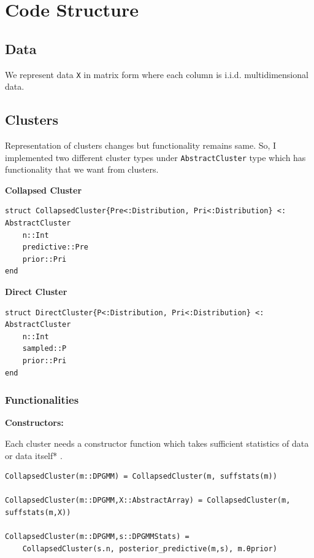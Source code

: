 \documentclass[a4paper]{article}
\begin{document}
\section{Code Structure}


\subsection{Data}

We represent data \texttt{X} in matrix form where each column is i.i.d.
multidimensional data.


\subsection{Clusters}

Representation of clusters changes but functionality remains same. So, I
implemented two different cluster types under \texttt{AbstractCluster}
type which has functionality that we want from clusters.

\textbf{Collapsed Cluster}

\begin{lstlisting}
struct CollapsedCluster{Pre<:Distribution, Pri<:Distribution} <: AbstractCluster
    n::Int
    predictive::Pre
    prior::Pri
end
\end{lstlisting}

\textbf{Direct Cluster}

\begin{lstlisting}
struct DirectCluster{P<:Distribution, Pri<:Distribution} <: AbstractCluster
    n::Int
    sampled::P
    prior::Pri
end
\end{lstlisting}


\subsubsection{Functionalities}

\textbf{Constructors:}

Each cluster needs a constructor function which takes sufficient
statistics of data or data itself* .
\begin{lstlisting}
CollapsedCluster(m::DPGMM) = CollapsedCluster(m, suffstats(m))

CollapsedCluster(m::DPGMM,X::AbstractArray) = CollapsedCluster(m, suffstats(m,X))

CollapsedCluster(m::DPGMM,s::DPGMMStats) = 
    CollapsedCluster(s.n, posterior_predictive(m,s), m.θprior)
\end{lstlisting}
\end{document}
